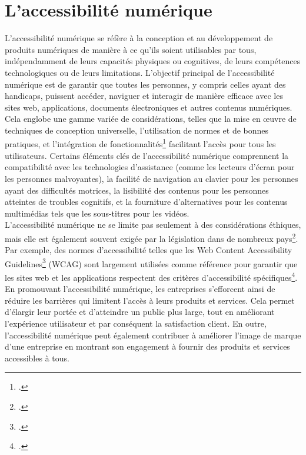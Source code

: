 \documentclass[12pt, a4paper]{report}
\begin{document}
\section{L'accessibilité numérique}

L'accessibilité numérique se réfère à la conception et au développement de produits numériques de manière à ce qu'ils soient utilisables par tous, indépendamment de leurs capacités physiques ou cognitives, de leurs compétences technologiques ou de leurs limitations. L'objectif principal de l'accessibilité numérique est de garantir que toutes les personnes, y compris celles ayant des handicaps, puissent accéder, naviguer et interagir de manière efficace avec les sites web, applications, documents électroniques et autres contenus numériques.\\

Cela englobe une gamme variée de considérations, telles que la mise en œuvre de techniques de conception universelle, l'utilisation de normes et de bonnes pratiques, et l'intégration de fonctionnalités\footcite{alajarmeh_non-visual_2021} facilitant l'accès pour tous les utilisateurs. Certains éléments clés de l'accessibilité numérique comprennent la compatibilité avec les technologies d'assistance (comme les lecteurs d'écran pour les personnes malvoyantes), la facilité de navigation au clavier pour les personnes ayant des difficultés motrices, la lisibilité des contenus pour les personnes atteintes de troubles cognitifs, et la fourniture d'alternatives pour les contenus multimédias tels que les sous-titres pour les vidéos.\\

L'accessibilité numérique ne se limite pas seulement à des considérations éthiques, mais elle est également souvent exigée par la législation dans de nombreux pays\footcite{noauthor_accessibilite_nodate}. Par exemple, des normes d'accessibilité telles que les Web Content Accessibility Guidelines\footcite{noauthor_criteres_nodate} (WCAG) sont largement utilisées comme référence pour garantir que les sites web et les applications respectent des critères d'accessibilité spécifiques\footcite{filipe_why_2023}.\\

En promouvant l'accessibilité numérique, les entreprises s'efforcent ainsi de réduire les barrières qui limitent l'accès à leurs produits et services. Cela permet d'élargir leur portée et d'atteindre un public plus large, tout en améliorant l'expérience utilisateur et par conséquent la satisfaction client. En outre, l'accessibilité numérique peut également contribuer à améliorer l'image de marque d'une entreprise en montrant son engagement à fournir des produits et services accessibles à tous.\\
\end{document}
